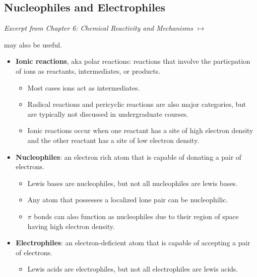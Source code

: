 \documentclass[12pt,a4paper]{article}
\begin{document}
\subsection{Nucleophiles and Electrophiles}\label{ssec:bar}
{\color{darklc}\textit{Excerpt from Chapter 6: Chemical Reactivity and Mechanisms $\mapsto$}}\label{Nucleophiles and Electrophiles}

{ may also be useful}.
\begin{itemize}
    \item \textbf{Ionic reactions}, {\color{G-Moon}aka polar reactions}: reactions that involve the particpation of ions as reactants, intermediates, or products.
        \begin{itemize}
            \item Most cases ions act as intermediates.
            \item Radical reactions and pericyclic reactions are also major categories, but are typically not discussed in undergraduate courses.
            \item Ionic reactions occur when one reactant has a site of {\color{neg}high electron density} and the other reactant has a site of {\color{pos}low electron density}.
        \end{itemize}
    \item \textbf{Nucleophiles}: an electron rich atom that is capable of donating a pair of electrons.
        \begin{itemize}
            \item {\color{neg}Lewis bases are nucleophiles}, but not all nucleophiles are lewis bases.
            \item Any atom that possesses a localized lone pair can be nucleophilic.
            \item $\pi$ bonds can also function as nucleophiles due to their region of space having high electron density.
        \end{itemize}
    \item \textbf{Electrophiles}: an electron-deficient atom that is capable of accepting a pair of electrons.
        \begin{itemize}
            \item {\color{pos}Lewis acids are electrophiles}, but not all electrophiles are lewis acids.
        \end{itemize}
\end{itemize}
\end{document}
